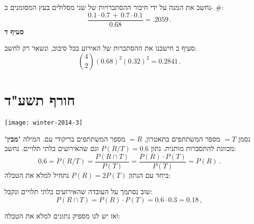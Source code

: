 נחשב את המנה על ידי חיבור ההסתברויות של שני מסלולים בעץ המסומנים ב-%
$\#$:
\[
\frac{0.1\cdot 0.7 \,+\, 0.7\cdot 0.1}{0.68} = .2059\,.
\]
\textbf{סעיף ד}

סעיף ב חישבנו את ההסתברות של האירוע בכל סיבוב, ונשאר רק לחשב:
\vspace{-1ex}
\[
{4\choose 2}(0.68)^2 (0.32)^2= 0.2841\,.
\]

\np
\section{חורף תשע"ד}

\begin{center}
\texttt{[image: winter-2014-3]}
\end{center}

נסמן
$=T$
מספר המשתתפים בתאטרון,
$=R$
מספר המשתתפים בריקודי עם. המילה 
"\textbf{מבין}"
מכוונת להתסברות מותנית. נתון
$P(R/T)=0.6$
וגם שהאירועים בלתי תלויים. נחשב:
\[
0.6=P(R/T)=\frac{P(R\cap T)}{P(T)}=\frac{P(R)\cdot P(T)}{P(T)}=P(R)\,.
\]
ביחד עם הנתון
$P(R)=2P(T)$
נתחיל למלא את הטבלה:
\begin{center}
\end{center}
שוב נסתמך על העובדה שהאירועים בלתי תלויים ונקבל:
\[
P(R\cap T)=P(R)\cdot P(T)=0.6\cdot 0.3=0.18\,,
\]

\np

ואז יש לנו מספיק נתונים למלא את הטבלה:
\begin{center}
\end{center}

